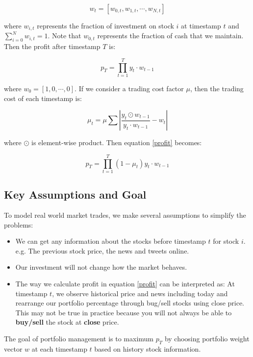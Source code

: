 \documentclass[11pt,a4paper]{article}
\begin{document}
\begin{equation}
w_t=[w_{0,t}, w_{1, t}, \cdots, w_{N, t}]
\end{equation}

where $w_{i,t}$ represents the fraction of investment on stock $i$ at timestamp $t$ and 
$\sum_{i=0}^{N}w_{i, t}=1$. Note that $w_{0,t}$ represents the fraction of cash that we maintain. Then the profit after timestamp $T$ is:

\begin{equation}
\label{profit}
p_T=\prod_{t=1}^{T}y_t\cdot w_{t-1}
\end{equation}

where $w_0=[1, 0, \cdots, 0]$. If we consider a trading cost factor $\mu$, then the trading cost of each timestamp is:

\begin{equation}
{\mu}_t=\mu\sum{|\frac{y_t \odot w_{t-1}}{y_t \cdot w_{t-1}} - w_{t}|}
\end{equation}

where $\odot$ is element-wise product. Then equation \ref{profit} becomes:

\begin{equation}
\label{eq:profit_mu}
p_T=\prod_{t=1}^{T}(1-\mu_t) y_t\cdot w_{t-1}
\end{equation}


\subsection{Key Assumptions and Goal}

To model real world market trades, we make several assumptions to simplify the problems:
\begin{itemize}
  \item We can get any information about the stocks before timestamp $t$ for stock $i$. e.g. The previous stock price, the news and tweets online.
  \item Our investment will not change how the market behaves.
  \item The way we calculate profit in equation \ref{profit} can be interpreted as: At timestamp $t$, we observe historical price and news including today and rearrange our portfolio percentage through bug/sell stocks using close price. This may not be true in practice because you will not always be able to \textbf{buy/sell} the stock at \textbf{close} price.
\end{itemize}

The goal of portfolio management is to maximum $p_T$ by choosing portfolio weight vector $w$ at each timestamp $t$ based on history stock information.
\end{document}
